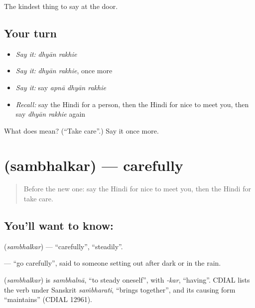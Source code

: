 \begin{grammarlens}[title={What you've built}]
The kindest thing to say at the door.
\end{grammarlens}

\subsection*{Your turn}
\begin{itemize}
\raggedright
  \item \emph{Say it:} \emph{dhyān rakhie}
  \item \emph{Say it:} \emph{dhyān rakhie}, once more
  \item \emph{Say it:} say \emph{apnā dhyān rakhie}
  \item \emph{Recall:} say the Hindi for a person, then the Hindi for nice to meet you, then say \emph{dhyān rakhie} again
\end{itemize}

\begin{tcolorbox}[breakable,colback=teal!4,colframe=teal!35!black,title={Before you move on}]
What does   mean? (\textquotedblleft{}Take care\textquotedblright{}.) Say it once more.
\end{tcolorbox}
\section[\texorpdfstring{\hi{संभलकर} (sambhalkar)}{संभलकर (sambhalkar)}]{ (sambhalkar) — carefully}

\label{lesson:HI-C121-sambhalkar}



\begin{quote}
Before the new one: say the Hindi for nice to meet you, then the Hindi for take care.
\end{quote}

\subsection*{You'll want to know: }
\textbf{} (\emph{sambhalkar}) — \textquotedblleft{}carefully\textquotedblright{}, \textquotedblleft{}steadily\textquotedblright{}.

\textbf{ } — \textquotedblleft{}go carefully\textquotedblright{}, said to someone setting out after dark or in the rain.

\begin{cousinweb}
\textbf{} (\emph{sambhalkar}) is \emph{sambhalnā}, \textquotedblleft{}to steady oneself\textquotedblright{}, with \emph{-kar}, \textquotedblleft{}having\textquotedblright{}. CDIAL lists the verb under Sanskrit \emph{saṁbharati}, \textquotedblleft{}brings together\textquotedblright{}, and its causing form \textquotedblleft{}maintains\textquotedblright{} (CDIAL 12961).
\end{cousinweb}

